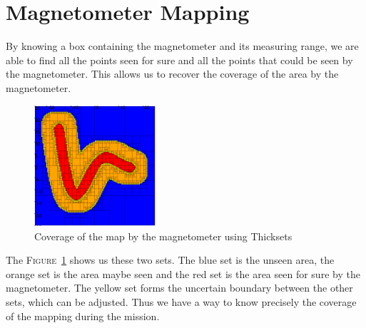 \section*{Magnetometer Mapping}
    By knowing a box containing the magnetometer and its measuring range, we are able to find all the points seen for sure and all the points that could be seen by the magnetometer. This allows us to recover the coverage of the area by the magnetometer.

    \begin{figure}[!htb]
        \centering
        \includegraphics[width=0.4\textwidth]{imgs/thickset_fine.png}
        \caption{\label{fig:thickset} Coverage of the map by the magnetometer using Thicksets}
    \end{figure}

    The \textsc{Figure}~\ref{fig:thickset} shows us these two sets. The blue set is the unseen area, the orange set is the area maybe seen and the red set is the area seen for sure by the magnetometer. The yellow set forms the uncertain boundary between the other sets, which can be adjusted. Thus we have a way to know precisely the coverage of the mapping during the mission.